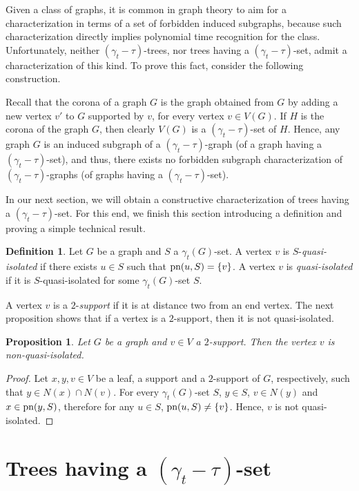 \documentclass[12pt]{article}%
\newtheorem{proposition}[theorem]{Proposition}
\theoremstyle{definition}
\newtheorem{definition}{Definition}
\newcommand{\gtt}{$(\gamma_t - \tau)$}
\begin{document}
Given a class of graphs, it is common in graph theory to aim for
a characterization in terms of a set of forbidden induced 
subgraphs, because such characterization directly implies
polynomial time recognition for the class. Unfortunately, neither
\gtt-trees, nor trees having a \gtt-set, admit a characterization
of this kind.   To prove this fact, consider the following construction.

Recall that the corona of a graph $G$ is the graph obtained from
$G$ by adding a new vertex $v'$ to $G$ supported by $v$, for
every vertex $v \in V(G)$.   If $H$ is the corona of the graph $G$,
then clearly $V(G)$ is a \gtt-set of $H$.   Hence, any graph
$G$ is an induced subgraph of a \gtt-graph (of a graph having a
\gtt-set), and thus, there exists no forbidden subgraph
characterization of \gtt-graphs (of graphs having a \gtt-set). 

In our next section, we will obtain a constructive characterization
of trees having a \gtt-set.   For this end, we finish this section
introducing a definition and proving a simple technical result.

\begin{definition}
Let $G$ be a graph and $S$ a $\gamma_t (G)$-set.   A vertex
$v$ is $S$-{\em quasi-isolated} if there exists $u \in S$ such
that $\textnormal{pn}(u,S) = \{ v \}$. A vertex $v$ is {\em
quasi-isolated} if it is $S$-quasi-isolated for some $\gamma_t
(G)$-set $S$.
\end{definition}   


A vertex $v$ is a $2$-{\em support} if it is at distance two from
an end vertex. The next proposition shows that if a vertex is a
$2$-support, then it is not quasi-isolated.

\begin{proposition}\label{sup-qi}
Let $G$ be a graph and $v\in V$ a $2$-support. Then the
vertex $v$ is non-quasi-isolated.
\end{proposition} 
 
\begin{proof}
Let $x, y, v \in V$ be a leaf, a support and a $2$-support of $G$,
respectively, such that $y \in N(x) \cap N(v)$.   For every
$\gamma_t (G)$-set $S$,  $y \in S$, $v \in N(y)$ and $x \in
\textnormal{pn} (y,S)$, therefore for any $u \in S$,
$\textnormal{pn} (u,S) \ne \{ v \}$.   Hence, $v$ is not
quasi-isolated.
\end{proof}


\section{Trees having a \gtt-set} \label{sec:trees}
\end{document}
